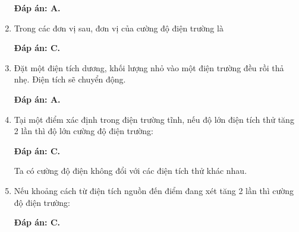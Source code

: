 \begin{enumerate}[label=\bfseries Câu \arabic*:]
	\hideall
	{		\textbf{Đáp án: A.}
		
		
		
	}
	\item {}
	
	
	{Trong các đơn vị sau, đơn vị của cường độ điện trường là
	}
	
	\hideall
	{		\textbf{Đáp án: C.}
		
		
		
	}
	\item {}
	
	
	{Đặt một điện tích dương, khối lượng nhỏ vào một điện trường đều rồi thả nhẹ. Điện tích sẽ chuyển động.
	}
	
	\hideall
	{		\textbf{Đáp án: A.}
		
		
		
	}
	\item {}
	
	
	{Tại một điểm xác định trong điện trường tĩnh, nếu độ lớn điện tích thử tăng 2 lần thì độ lớn cường độ điện trường:
	}
	
	\hideall
	{		\textbf{Đáp án: C.}
		
		Ta có cường độ điện không đổi với các điện tích thử khác nhau.
		
	}
	\item {}
	
	
	{Nếu khoảng cách từ điện tích nguồn đến điểm đang xét tăng 2 lần thì cường độ điện trường:
	}
	
	\hideall
	{		\textbf{Đáp án: C.}
		
		
		
	}
\end{enumerate}


